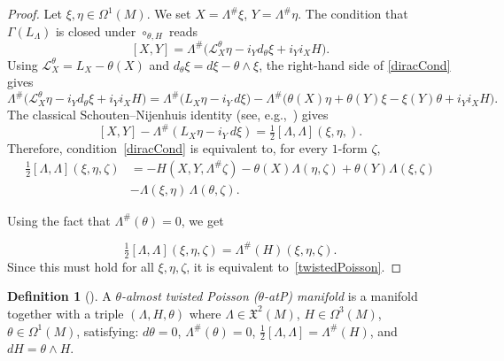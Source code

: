 \documentclass[11pt,a4paper]{article}
\theoremstyle{plain}
\theoremstyle{definition}
\newtheorem{definition}[theorem]{Definition}
\theoremstyle{remark}
\begin{document}
\begin{proof}
Let $\xi,\eta\in\Omega^1(M)$. We set $X=\Lambda^\#\xi$, $Y=\Lambda^\#\eta$. The
condition that $\Gamma(L_\Lambda)$ is closed under $\circ_{\theta,H}$ reads
\begin{equation}\label{diracCond}
  [X,Y] = \Lambda^\#\!\bigl(\mathcal{L}^\theta_X\eta - i_Yd_{\theta}\xi + i_Yi_XH\bigr).
\end{equation}
Using $\mathcal{L}^\theta_X = L_X - \theta(X)$ and
$d_{\theta}\xi = d\xi - \theta\wedge\xi$,  the right-hand side of \eqref{diracCond} gives
$$
  \Lambda^\#\!\bigl(\mathcal{L}^\theta_X\eta - i_Yd_{\theta}\xi + i_Yi_XH\bigr)
  =\Lambda^\#\!\bigl( L_X\eta - i_Y\, d\xi\bigr) - \Lambda^\#\!\bigl(\theta(X)\eta + \theta(Y)\xi
    - \xi(Y)\theta + i_Yi_XH\bigr).
$$
The classical Schouten--Nijenhuis identity (see, e.g.,~\cite[\S 2.2]{CrainicFernandesMarcut2021}) gives
\begin{equation}\label{SN}
  [X,Y] - \Lambda^\#(L_X\eta - i_Y\,d\xi)
  = \tfrac{1}{2}[\Lambda,\Lambda](\xi,\eta, ).
\end{equation}
Therefore, condition~\eqref{diracCond} is equivalent to, for every $1$-form $\zeta$,
\begin{align*}
  \tfrac{1}{2}[\Lambda,\Lambda](\xi,\eta,\zeta)
  &= -H(X,Y,\Lambda^\#\zeta)
    - \theta(X)\Lambda(\eta,\zeta)
    + \theta(Y)\Lambda(\xi,\zeta)\\
    &- \Lambda(\xi,\eta)\,\Lambda(\theta,\zeta).
\end{align*}

 Using the fact that $\Lambda^\#(\theta)=0$, we get

$$
  \tfrac{1}{2}[\Lambda,\Lambda](\xi,\eta,\zeta)
  = \Lambda^\#(H)(\xi,\eta,\zeta).
$$
 Since this must hold for all $\xi,\eta,\zeta$, it is equivalent to~\eqref{twistedPoisson}.

\end{proof}


\begin{definition}[\cite{NansidiTangueDongho2025b}]\label{def_theta_alP}
  A \emph{$\theta$-almost twisted Poisson ($\theta$-atP) manifold} is a manifold together with a triple
  $(\Lambda,H,\theta)$ where
  $\Lambda\in\mathfrak{X}^{2}(M)$,
  $H\in\Omega^{3}(M)$,
  $\theta\in\Omega^{1}(M)$, satisfying: $d\theta = 0$, $\Lambda^{\#}(\theta) = 0$,  $\tfrac{1}{2}[\Lambda,\Lambda] = \Lambda^{\#}(H)$, and $dH = \theta\wedge H$.
\end{definition}
\end{document}
